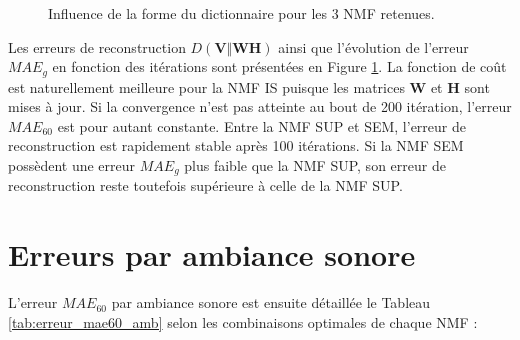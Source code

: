 \begin{figure}[h!]
\centering
{}%
\qquad
{}%
\caption{Influence de la forme du dictionnaire pour les 3 NMF retenues.}
\label{fig:evolution_mae}
\end{figure}

Les erreurs de reconstruction $D(\mathbf{V} \Vert \mathbf{WH})$ ainsi que l'évolution de l'erreur $MAE_g$ en fonction des itérations sont présentées en Figure \ref{fig:evolution_mae}. La fonction de coût est naturellement meilleure pour la NMF IS puisque les matrices $\mathbf{W}$ et $\mathbf{H}$ sont mises à jour. Si la convergence n'est pas atteinte au bout de 200 itération, l'erreur $MAE_{60}$ est pour autant constante. 
Entre la NMF SUP et SEM, l'erreur de reconstruction est rapidement stable après 100 itérations. Si la NMF SEM possèdent une erreur $MAE_g$ plus faible que la NMF SUP, son erreur de reconstruction reste toutefois supérieure à celle de la NMF SUP. 


\section{Erreurs par ambiance sonore}

L'erreur $MAE_{60}$ par ambiance sonore est ensuite détaillée le Tableau \ref{tab:erreur_mae60_amb} selon les combinaisons optimales de chaque NMF : 


